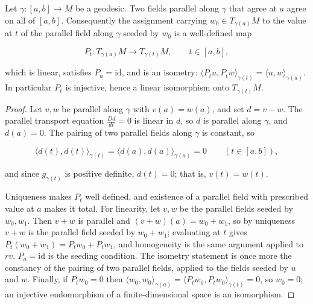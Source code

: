 \begin{lemma}
  \label{lem:dc-ch8-2-1-parallel-transport-map}


  Let $\gamma:[a,b]\to M$ be a geodesic. Two fields parallel along $\gamma$ that agree at $a$
  agree on all of $[a,b]$. Consequently the assignment carrying $w_0\in T_{\gamma(a)}M$ to the
  value at $t$ of the parallel field along $\gamma$ seeded by $w_0$ is a well-defined map

  $$
  P_t:T_{\gamma(a)}M\longrightarrow T_{\gamma(t)}M,\qquad t\in[a,b],
  $$

  which is linear, satisfies $P_a=\mathrm{id}$, and is an isometry:
  $\langle P_tu,P_tw\rangle_{\gamma(t)}=\langle u,w\rangle_{\gamma(a)}$. In particular $P_t$ is
  injective, hence a linear isomorphism onto $T_{\gamma(t)}M$.
\end{lemma}
\begin{proof}

\sketch
  Let $v,w$ be parallel along $\gamma$ with $v(a)=w(a)$, and set $d=v-w$. The parallel
  transport equation $\frac{Dd}{dt}=0$ is linear in $d$, so $d$ is parallel along $\gamma$,
  and $d(a)=0$. The pairing of two parallel fields along $\gamma$ is constant, so

  $$
  \langle d(t),d(t)\rangle_{\gamma(t)}=\langle d(a),d(a)\rangle_{\gamma(a)}=0
  \qquad(t\in[a,b]),
  $$

  and since $g_{\gamma(t)}$ is positive definite, $d(t)=0$; that is, $v(t)=w(t)$.

  Uniqueness makes $P_t$ well defined, and existence of a parallel field with prescribed value
  at $a$ makes it total. For linearity, let $v,w$ be the parallel fields seeded by $w_0,w_1$.
  Then $v+w$ is parallel and $(v+w)(a)=w_0+w_1$, so by uniqueness $v+w$ is the parallel field
  seeded by $w_0+w_1$; evaluating at $t$ gives $P_t(w_0+w_1)=P_tw_0+P_tw_1$, and homogeneity is
  the same argument applied to $rv$. $P_a=\mathrm{id}$ is the seeding condition. The isometry
  statement is once more the constancy of the pairing of two parallel fields, applied to the
  fields seeded by $u$ and $w$. Finally, if $P_tw_0=0$ then
  $\langle w_0,w_0\rangle_{\gamma(a)}=\langle P_tw_0,P_tw_0\rangle_{\gamma(t)}=0$, so $w_0=0$;
  an injective endomorphism of a finite-dimensional space is an isomorphism.
\end{proof}

